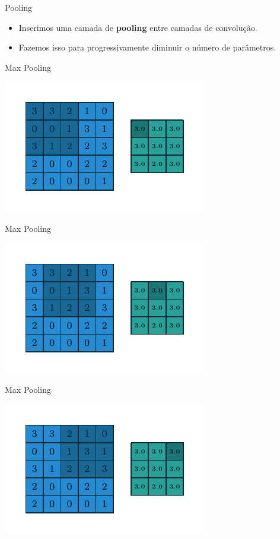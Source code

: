 \documentclass[10pt]{beamer}
\begin{document}
\begin{frame}{Pooling}
\begin{itemize}
\item  Inserimos uma camada de \textbf{pooling} entre camadas de convolução.
\vspace{0.3cm}
\item  Fazemos isso para progressivamente diminuir o número de parâmetros.
\end{itemize}
\end{frame}

\begin{frame}{Max Pooling}
\begin{center}
\includegraphics[scale=1.5]{images/numerical_max_pooling_00.pdf}
\end{center}
\end{frame}

\begin{frame}{Max Pooling}
\begin{center}
\includegraphics[scale=1.5]{images/numerical_max_pooling_01.pdf}
\end{center}
\end{frame}

\begin{frame}{Max Pooling}
\begin{center}
\includegraphics[scale=1.5]{images/numerical_max_pooling_02.pdf}
\end{center}
\end{frame}
\end{document}
